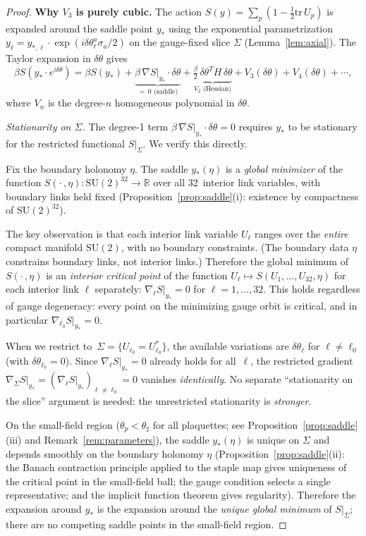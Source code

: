 \documentclass[11pt]{article}
\theoremstyle{definition}
\newcommand{\SU}{\mathrm{SU}}
\newcommand{\tr}{\mathrm{tr}}
\newcommand{\R}{\mathbb{R}}
\begin{document}
\begin{proof}
\textbf{Why $V_3$ is purely cubic.}
The action $S(y)=\sum_p(1-\frac{1}{2}\tr\,U_p)$ is expanded around
the saddle point $y_*$ using the exponential parametrization
$y_\ell=y_{*,\ell}\cdot\exp(i\delta\theta_\ell^a\sigma_a/2)$ on
the gauge-fixed slice $\Sigma$
(Lemma~\ref{lem:axial}).  The Taylor expansion in
$\delta\theta$ gives
\begin{equation}\label{eq:Sexpand}
\beta S(y_*\cdot e^{i\delta\theta})
=\beta S(y_*)+\underbrace{\beta\,\nabla S|_{y_*}\cdot\delta\theta}%
_{=\,0\text{ (saddle)}}
+\underbrace{\tfrac{\beta}{2}\,\delta\theta^T H\,\delta\theta}%
_{V_2\text{ (Hessian)}}
+V_3(\delta\theta)+V_4(\delta\theta)+\cdots,
\end{equation}
where $V_n$ is the degree-$n$ homogeneous polynomial in $\delta\theta$.

\emph{Stationarity on $\Sigma$.}
The degree-1 term $\beta\,\nabla S|_{y_*}\cdot\delta\theta=0$
requires $y_*$ to be stationary for the restricted functional
$S|_\Sigma$.  We verify this directly.

Fix the boundary holonomy $\eta$.  The saddle $y_*(\eta)$ is
a \emph{global minimizer} of the function
$S(\cdot\,,\eta):\SU(2)^{32}\to\R$ over all
32~interior link variables, with boundary links held fixed
(Proposition~\ref{prop:saddle}(i): existence by compactness of
$\SU(2)^{32}$).

The key observation is that each interior link variable
$U_\ell$ ranges over the \emph{entire} compact manifold $\SU(2)$,
with no boundary constraints.  (The boundary data $\eta$
constrains boundary links, not interior links.)
Therefore the global minimum of $S(\cdot\,,\eta)$ is an
\emph{interior critical point} of the function
$U_\ell\mapsto S(U_1,\ldots,U_{32},\eta)$ for each interior
link $\ell$ separately: $\nabla_\ell S|_{y_*}=0$ for
$\ell=1,\ldots,32$.  This holds regardless of gauge
degeneracy: every point on the minimizing gauge orbit is
critical, and in particular $\nabla_{\ell_0}S|_{y_*}=0$.

When we restrict to~$\Sigma=\{U_{\ell_0}=U_{\ell_0}^*\}$, the
available variations are $\delta\theta_\ell$ for $\ell\ne\ell_0$
(with $\delta\theta_{\ell_0}=0$).  Since
$\nabla_\ell S|_{y_*}=0$ already holds for all~$\ell$, the
restricted gradient $\nabla_\Sigma S|_{y_*}
=(\nabla_\ell S|_{y_*})_{\ell\ne\ell_0}=0$ vanishes
\emph{identically}.  No separate ``stationarity on the
slice'' argument is needed: the unrestricted stationarity is
\emph{stronger}.

On the small-field
region ($\theta_p<\theta_\sharp$ for all plaquettes;
see Proposition~\ref{prop:saddle}(iii) and
Remark~\ref{rem:parameters}), the
saddle $y_*(\eta)$ is unique on $\Sigma$ and
depends smoothly on the boundary holonomy $\eta$
(Proposition~\ref{prop:saddle}(ii): the Banach contraction principle
applied to the staple map gives
uniqueness of the critical point in the small-field ball;
the gauge condition selects a single
representative; and the implicit function theorem gives regularity).
Therefore the expansion around $y_*$ is the expansion around the
\emph{unique global minimum} of $S|_\Sigma$; there are no
competing saddle points in the small-field region.


\end{proof}
\end{document}
